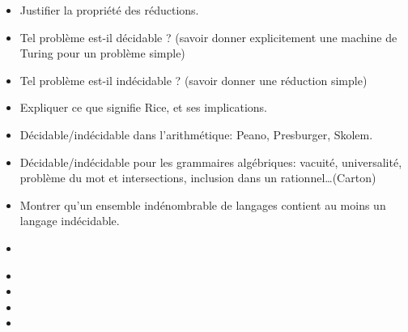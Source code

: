 \documentclass{agregfiche}
\begin{document}
\secquestionsclassiques
\begin{itemize}
\item Justifier la propriété des réductions.
\item Tel problème est-il décidable ? (savoir donner explicitement une machine de Turing pour un problème simple)
\item Tel problème est-il indécidable ? (savoir donner une réduction simple)
\item Expliquer ce que signifie Rice, et ses implications.
\item Décidable/indécidable dans l'arithmétique: Peano, Presburger, Skolem.
\item Décidable/indécidable pour les grammaires algébriques: vacuité, 
universalité, problème du mot et intersections, inclusion dans un 
rationnel\dots (Carton)
\item Montrer qu'un ensemble indénombrable de langages contient au 
moins un langage indécidable.
\end{itemize}

\secreferences
\begin{itemize}
\item 
\end{itemize}

\secdev
\begin{itemize}
\item 
\item 
\item 
\item 

\end{itemize}
\end{document}
